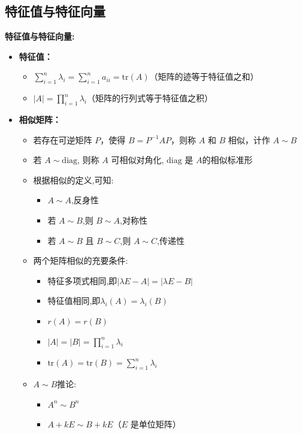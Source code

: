 \documentclass[10pt]{article}
\begin{document}
\begin{multicols}{2}
\section*{特征值与特征向量}

\textbf{特征值与特征向量:}
\begin{itemize}
  \item \textbf{特征值：}
    \begin{itemize}
      \item \(\sum_{i=1}^n \lambda_i = \sum_{i=1}^n a_{ii} = \mathrm{tr}(A)\)（矩阵的迹等于特征值之和）
      \item \( |A| = \prod_{i=1}^n \lambda_i \)（矩阵的行列式等于特征值之积）
    \end{itemize}
  \item \textbf{相似矩阵：}
    \begin{itemize}
      \item 若存在可逆矩阵 \(P\)，使得 \(B = P^{-1}AP\)，则称 \(A\) 和 \(B\) 相似，计作 \(A \sim B\)
      \item 若 \( A \sim \mathrm{diag} \), 则称 \(A\) 可相似对角化, \(\mathrm{diag}\) 是 \(A\)的相似标准形
      \item 根据相似的定义,可知:
        \begin{itemize}
          \item \( A \sim A \),反身性
          \item 若 \( A \sim B \),则 \( B \sim A \),对称性
          \item 若 \( A \sim B \) 且 \( B \sim C \),则 \( A \sim C \),传递性
        \end{itemize}
      \item 两个矩阵相似的充要条件:
        \begin{itemize}
          \item 特征多项式相同,即\(|\lambda E - A | = |\lambda E - B|\)
          \item 特征值相同,即\(\lambda_i(A) = \lambda_i(B)\)
          \item \(r(A) = r(B)\)
          \item \(|A| = |B| = \prod_{i=1}^n \lambda_i\)
          \item \(\mathrm{tr}(A) = \mathrm{tr}(B) = \sum_{i=1}^n \lambda_i\)
        \end{itemize}
      \item \(A \sim B\)推论:
        \begin{itemize}
          \item \(A^n \sim B^n\)
          \item \(A + kE \sim B + kE\)（\(E\) 是单位矩阵）

\end{itemize}
\end{itemize}
\end{itemize}
\end{multicols}
\end{document}
